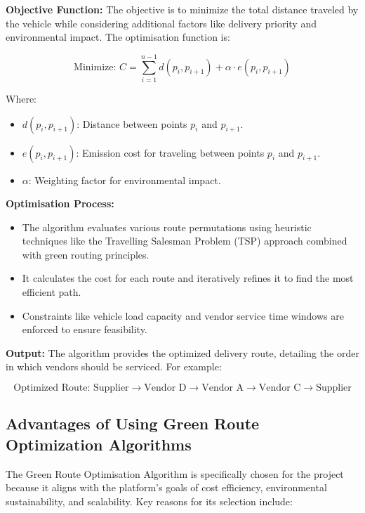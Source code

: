 \textbf{Objective Function:}
The objective is to minimize the total distance traveled by the vehicle while considering additional factors like delivery priority and environmental impact. The optimisation function is:

\[
    \text{Minimize: } C = \sum_{i=1}^{n-1} d(p_i, p_{i+1}) + \alpha \cdot e(p_i, p_{i+1})
\]

Where:
\begin{itemize}
    \item \(d(p_i, p_{i+1})\): Distance between points \(p_i\) and \(p_{i+1}\).
    \item \(e(p_i, p_{i+1})\): Emission cost for traveling between points \(p_i\) and \(p_{i+1}\).
    \item \(\alpha\): Weighting factor for environmental impact.
\end{itemize}

\textbf{Optimisation Process:}
\begin{itemize}
    \item The algorithm evaluates various route permutations using heuristic techniques like the Travelling Salesman Problem (TSP) approach combined with green routing principles.
    \item It calculates the cost for each route and iteratively refines it to find the most efficient path.
    \item Constraints like vehicle load capacity and vendor service time windows are enforced to ensure feasibility.
\end{itemize}

\textbf{Output:}
The algorithm provides the optimized delivery route, detailing the order in which vendors should be serviced. For example:

\[
    \text{Optimized Route: Supplier} \rightarrow \text{Vendor D} \rightarrow \text{Vendor A} \rightarrow \text{Vendor C} \rightarrow \text{Supplier}
\]

\subsection{Advantages of Using Green Route Optimization Algorithms}

The Green Route Optimisation Algorithm is specifically chosen for the project because it aligns with the platform's goals of cost efficiency, environmental sustainability, and scalability. Key reasons for its selection include:

